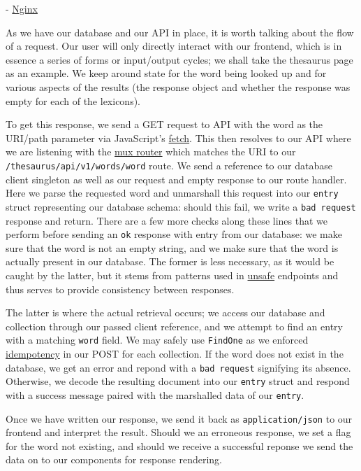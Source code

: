 \documentclass[11pt, twoside, reqno]{book}
\begin{document}
- \href{https://www.nginx.com}{Nginx}

As we have our database and our API in place, it is worth talking about the flow of a request. Our user will only directly interact with our frontend, which is in essence a series of forms or input/output cycles; we shall take the thesaurus page as an example. We keep around state for the word being looked up and for various aspects of the results (the response object and whether the response was empty for each of the lexicons).

To get this response, we send a GET request to API with the word as the URI/path parameter via JavaScript's \href{https://developer.mozilla.org/en-US/docs/Web/API/Fetch_API}{fetch}. This then resolves to our API where we are listening with the \href{http://www.gorillatoolkit.org/pkg/mux}{mux router} which matches the URI to our \texttt{/thesaurus/api/v1/words/{word}} route. We send a reference to our database client singleton as well as our request and empty response to our route handler. Here we parse the requested word and unmarshall this request into our \texttt{entry} struct representing our database schema: should this fail, we write a \texttt{bad request} response and return. There are a few more checks along these lines that we perform before sending an \texttt{ok} response with entry from our database: we make sure that the word is not an empty string, and we make sure that the word is actually present in our database. The former is less necessary, as it would be caught by the latter, but it stems from patterns used in \href{https://developer.mozilla.org/en-US/docs/Glossary/safe}{unsafe} endpoints and thus serves to provide consistency between responses.

The latter is where the actual retrieval occurs; we access our database and collection through our passed client reference, and we attempt to find an entry with a matching \texttt{word} field. We may safely use \texttt{FindOne} as we enforced \href{https://developer.mozilla.org/en-US/docs/Glossary/idempotent}{idempotency} in our POST for each collection. If the word does not exist in the database, we get an error and repond with a \texttt{bad request} signifying its absence. Otherwise, we decode the resulting document into our \texttt{entry} struct and respond with a success message paired with the marshalled data of our \texttt{entry}.

Once we have written our response, we send it back as \texttt{application/json} to our frontend and interpret the result. Should we an erroneous response, we set a flag for the word not existing, and should we receive a successful reponse we send the data on to our components for response rendering.
\end{document}
